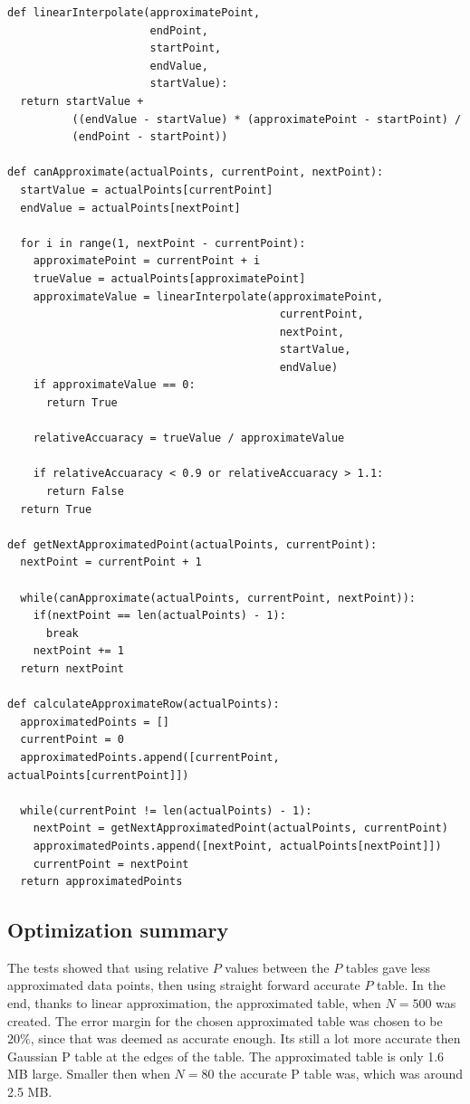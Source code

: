 \documentclass[12pt]{article}
\begin{document}
\begin{verbatim}
def linearInterpolate(approximatePoint,
                      endPoint,
                      startPoint,
                      endValue,
                      startValue):
  return startValue +
          ((endValue - startValue) * (approximatePoint - startPoint) /
          (endPoint - startPoint))

def canApproximate(actualPoints, currentPoint, nextPoint):
  startValue = actualPoints[currentPoint]
  endValue = actualPoints[nextPoint]

  for i in range(1, nextPoint - currentPoint):
    approximatePoint = currentPoint + i
    trueValue = actualPoints[approximatePoint]
    approximateValue = linearInterpolate(approximatePoint,
                                          currentPoint,
                                          nextPoint,
                                          startValue,
                                          endValue)
    if approximateValue == 0:
      return True

    relativeAccuaracy = trueValue / approximateValue

    if relativeAccuaracy < 0.9 or relativeAccuaracy > 1.1:
      return False
  return True

def getNextApproximatedPoint(actualPoints, currentPoint):
  nextPoint = currentPoint + 1

  while(canApproximate(actualPoints, currentPoint, nextPoint)):
    if(nextPoint == len(actualPoints) - 1):
      break
    nextPoint += 1
  return nextPoint

def calculateApproximateRow(actualPoints):
  approximatedPoints = []
  currentPoint = 0
  approximatedPoints.append([currentPoint, actualPoints[currentPoint]])

  while(currentPoint != len(actualPoints) - 1):
    nextPoint = getNextApproximatedPoint(actualPoints, currentPoint)
    approximatedPoints.append([nextPoint, actualPoints[nextPoint]])
    currentPoint = nextPoint
  return approximatedPoints

\end{verbatim}

\subsection{Optimization summary}
The tests showed that using relative $P$ values between the $P$ tables gave less approximated data points, then using straight forward accurate $P$ table. In the end, thanks to linear approximation, the approximated table, when $N=500$ was created. The error margin for the chosen approximated table was chosen to be $20\%$, since that was deemed as accurate enough. Its still a lot more accurate then Gaussian P table at the edges of the table. The approximated table is only 1.6 MB large. Smaller then when $N=80$ the accurate P table was, which was around 2.5 MB.
\end{document}
